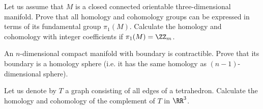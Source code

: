 




\exercises
\begin{xca}
Let us assume that $M$ is a closed connected orientable
three-dimensional manifold. Prove that all homology and
cohomology groups can be expressed in terms of its fundamental
group $\pi_1(M)$. Calculate the homology and cohomology with
integer coefficients if $\pi_1(M)=\ZZ_m$.
\end{xca}
\begin{xca}
An $n$-dimensional compact manifold with boundary is
contractible. Prove that its boundary is a homology sphere
(i.e. it has the same homology as $(n-1)$-dimensional sphere).
\end{xca}
\begin{xca}
Let us denote by $T$ a graph consisting of all edges of a
tetrahedron. Calculate the homology and cohomology of the
complement of $T$ in $\RR^3$.
\end{xca}
